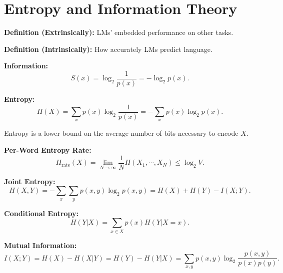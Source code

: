 \documentclass{article}
\newcommand{\ra}{\rightarrow}
\begin{document}
\setlength{\parindent}{0mm}

\section*{Entropy and Information Theory}

\textbf{Definition (Extrinsically):} LMs' embedded performance on other tasks.

\textbf{Definition (Intrinsically):} How accurately LMs predict language.

\textbf{Information:}
\[S(x) = \log_2\frac{1}{p(x)}=-\log_2 p(x).\]

\textbf{Entropy:}
\[H(X) = \sum_{x} p(x) \log_2\frac{1}{p(x)} = -\sum_x p(x) \log_2 p(x).\]

Entropy is a lower bound on the average number of bits necessary to encode \(X\).

\textbf{Per-Word Entropy Rate:}
\[H_{\operatorname{{rate}}}(X) = \lim_{{N\ra \infty}}\frac{1}{N} H(X_1,\cdots, X_N)\leq \log_2 V.\]

\textbf{Joint Entropy:}
\[H(X,Y) = -\sum_x \sum_y p(x,y) \log_2 p(x,y) = H(X) + H(Y) - I(X;Y).\]

\textbf{Conditional Entropy:}
\[H(Y|X) = \sum_{x\in X} p(x) H(Y|X=x).\]

\textbf{Mutual Information:}
\[I(X;Y) = H(X) - H(X|Y) = H(Y) - H(Y|X) = \sum_{x,y}p(x,y) \log_2\frac{p(x,y)}{p(x)p(y)}.\]
\end{document}
